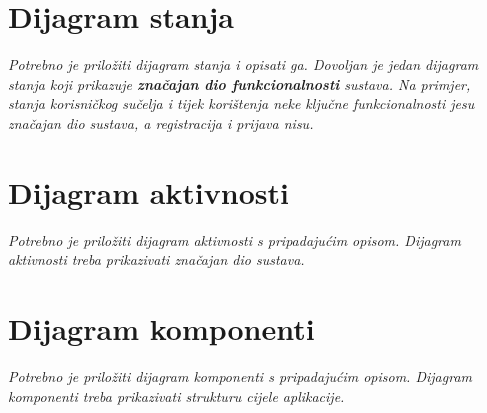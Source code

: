 			
			
			\eject
		
		\section{Dijagram stanja}
			
			
			
			\textit{Potrebno je priložiti dijagram stanja i opisati ga. Dovoljan je jedan dijagram stanja koji prikazuje \textbf{značajan dio funkcionalnosti} sustava. Na primjer, stanja korisničkog sučelja i tijek korištenja neke ključne funkcionalnosti jesu značajan dio sustava, a registracija i prijava nisu. }
			
			
			\eject 
		
		\section{Dijagram aktivnosti}
			
			
			 \textit{Potrebno je priložiti dijagram aktivnosti s pripadajućim opisom. Dijagram aktivnosti treba prikazivati značajan dio sustava.}
			
			\eject
		\section{Dijagram komponenti}
		
		
			 \textit{Potrebno je priložiti dijagram komponenti s pripadajućim opisom. Dijagram komponenti treba prikazivati strukturu cijele aplikacije.}
